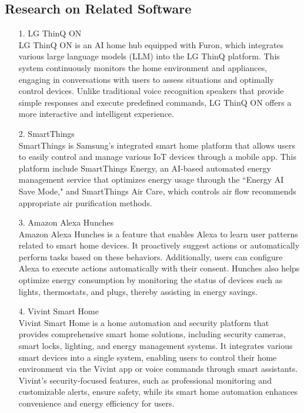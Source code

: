 \documentclass[conference]{IEEEtran}
\begin{document}
\subsection{Research on Related Software}

\begin{itemize}
\item [1.]LG ThinQ ON\\
LG ThinQ ON is an AI home hub equipped with Furon, which integrates various large language models (LLM) into the LG ThinQ platform. This system continuously monitors the home environment and appliances, engaging in conversations with users to assess situations and optimally control devices. Unlike traditional voice recognition speakers that provide simple responses and execute predefined commands, LG ThinQ ON offers a more interactive and intelligent experience. \\
\item [2.]SmartThings\\
SmartThings is Samsung’s integrated smart home platform that allows users to easily control and manage various IoT devices through a mobile app. This platform include SmartThings Energy, an AI-based automated energy management service that optimizes energy usage through the ``Energy AI Save Mode," and SmartThings Air Care, which controls air flow recommends appropriate air purification methods.\\
\item [3.]Amazon Alexa Hunches\\
Amazon Alexa Hunches is a feature that enables Alexa to learn user patterns related to smart home devices. It proactively suggest actions or automatically perform tasks based on these behaviors. Additionally, users can configure Alexa to execute actions automatically with their consent. Hunches also helps optimize energy consumption by monitoring the status of devices such as lights, thermostats, and plugs, thereby assisting in energy savings.
\\
\item [4.]Vivint Smart Home\\
Vivint Smart Home is a home automation and security platform that provides comprehensive smart home solutions, including security cameras, smart locks, lighting, and energy management systems. It integrates various smart devices into a single system, enabling users to control their home environment via the Vivint app or voice commands through smart assistants. Vivint's security-focused features, such as professional monitoring and customizable alerts, ensure safety, while its smart home automation enhances convenience and energy efficiency for users.

\end{itemize}
\end{document}
